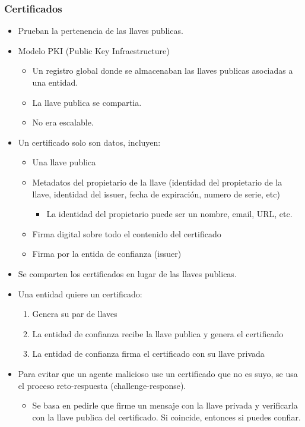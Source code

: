 \documentclass[11pt]{article}
\begin{document}
\subsubsection{Certificados}
\label{sec:org5b0f5e9}
\begin{itemize}
\item Prueban la pertenencia de las llaves publicas.

\item Modelo PKI (Public Key Infraestructure)
\begin{itemize}
\item Un registro global donde se almacenaban las llaves publicas asociadas a una entidad.
\item La llave publica se compartia.
\item No era escalable.
\end{itemize}

\item Un certificado solo son datos, incluyen:
\begin{itemize}
\item Una llave publica
\item Metadatos del propietario de la llave (identidad del propietario de la llave, identidad del issuer, fecha de expiración, numero de serie, etc)
\begin{itemize}
\item La identidad del propietario puede ser un nombre, email, URL, etc.
\end{itemize}
\item Firma digital sobre todo el contenido del certificado
\item Firma por la entida de confianza (issuer)
\end{itemize}

\item Se comparten los certificados en lugar de las llaves publicas.
\item Una entidad quiere un certificado:
\begin{enumerate}
\item Genera su par de llaves
\item La entidad de confianza recibe la llave publica y genera el certificado
\item La entidad de confianza firma el certificado con su llave privada
\end{enumerate}

\item Para evitar que un agente malicioso use un certificado que no es suyo, se usa el proceso reto-respuesta (challenge-response).
\begin{itemize}
\item Se basa en pedirle que firme un mensaje con la llave privada y verificarla con la llave publica del certificado. Si coincide, entonces si puedes confiar.
\end{itemize}


\end{itemize}
\end{document}
